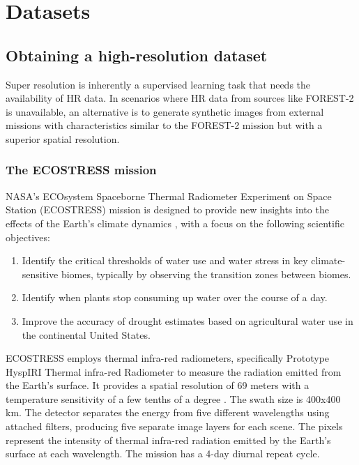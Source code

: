 \section{Datasets}

\subsection{Obtaining a high-resolution dataset}
    
    
Super resolution is inherently a supervised learning task that needs the availability of HR data. In scenarios where HR data from sources like FOREST-2 is unavailable, an alternative is to generate synthetic images from external missions with characteristics similar to the FOREST-2 mission but with a superior spatial resolution.

\subsubsection{The ECOSTRESS mission}

NASA's ECOsystem Spaceborne Thermal Radiometer Experiment on Space Station (ECOSTRESS) mission is designed to provide new insights into the effects of the Earth's climate dynamics \cite{ECOSTRESS2023}, with a focus on the following scientific objectives:

\begin{enumerate}
    \item Identify the critical thresholds of water use and water stress in key climate-sensitive biomes, typically by observing the transition zones between biomes.
    \item Identify when plants stop consuming up water over the course of a day.
    \item Improve the accuracy of drought estimates based on agricultural water use in the continental United States. 
\end{enumerate}

ECOSTRESS employs thermal infra-red radiometers, specifically Prototype HyspIRI Thermal infra-red Radiometer \cite{PhyTIR2023} to measure the radiation emitted from the Earth's surface. It provides a spatial resolution of 69 meters with a temperature sensitivity of a few tenths of a degree \cite{ECOSTRESS2023}. The swath size is 400x400 km. The detector separates the energy from five different wavelengths using attached filters, producing five separate image layers for each scene. The pixels represent the intensity of thermal infra-red radiation emitted by the Earth's surface at each wavelength. The mission has a 4-day diurnal repeat cycle.


